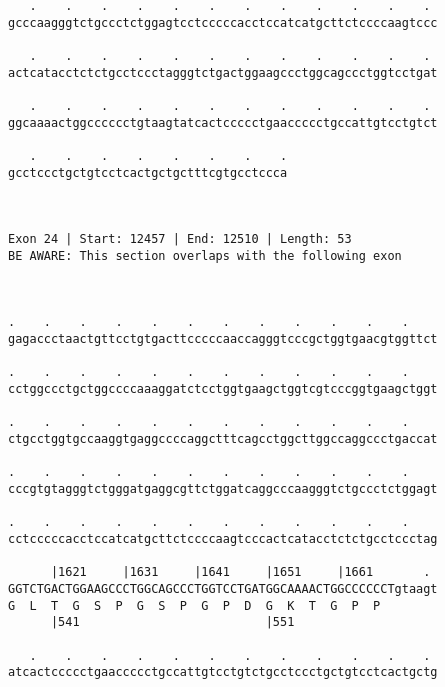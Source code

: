 \documentclass{article}
\begin{document}
\begin{Verbatim}
   .    .    .    .    .    .    .    .    .    .    .    . 
gcccaagggtctgccctctggagtcctcccccacctccatcatgcttctccccaagtccc
                                                            
   .    .    .    .    .    .    .    .    .    .    .    . 
actcatacctctctgcctccctagggtctgactggaagccctggcagccctggtcctgat
                                                            
   .    .    .    .    .    .    .    .    .    .    .    . 
ggcaaaactggcccccctgtaagtatcactccccctgaaccccctgccattgtcctgtct
                                                            
   .    .    .    .    .    .    .    .
gcctccctgctgtcctcactgctgctttcgtgcctccca
                                       
                                       
 
Exon 24 | Start: 12457 | End: 12510 | Length: 53
BE AWARE: This section overlaps with the following exon



.    .    .    .    .    .    .    .    .    .    .    .    
gagaccctaactgttcctgtgacttcccccaaccagggtcccgctggtgaacgtggttct
                                                            
.    .    .    .    .    .    .    .    .    .    .    .    
cctggccctgctggccccaaaggatctcctggtgaagctggtcgtcccggtgaagctggt
                                                            
.    .    .    .    .    .    .    .    .    .    .    .    
ctgcctggtgccaaggtgaggccccaggctttcagcctggcttggccaggccctgaccat
                                                            
.    .    .    .    .    .    .    .    .    .    .    .    
cccgtgtagggtctgggatgaggcgttctggatcaggcccaagggtctgccctctggagt
                                                            
.    .    .    .    .    .    .    .    .    .    .    .    
cctcccccacctccatcatgcttctccccaagtcccactcatacctctctgcctccctag
                                                            
      |1621     |1631     |1641     |1651     |1661       . 
GGTCTGACTGGAAGCCCTGGCAGCCCTGGTCCTGATGGCAAAACTGGCCCCCCTgtaagt
G  L  T  G  S  P  G  S  P  G  P  D  G  K  T  G  P  P        
      |541                          |551                    
  
   .    .    .    .    .    .    .    .    .    .    .    . 
atcactccccctgaaccccctgccattgtcctgtctgcctccctgctgtcctcactgctg
                                                            

\end{Verbatim}
\end{document}

